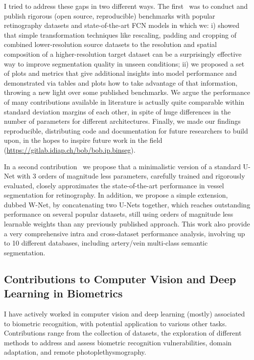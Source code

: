 \documentclass[11pt,a4paper,sans]{moderncv}
\begin{document}
I tried to address these gaps in two different ways.  The
first~\cite{arxiv-2019} was to conduct and publish rigorous (open source,
reproducible) benchmarks with popular retinography datasets and
state-of-the-art FCN models in which we: i) showed that simple transformation
techniques like rescaling, padding and cropping of combined lower-resolution
source datasets to the resolution and spatial composition of a
higher-resolution target dataset can be a surprisingly effective way to improve
segmentation quality in unseen conditions; ii) we proposed a set of plots and
metrics that give additional insights into model performance and demonstrated
via tables and plots how to take advantage of that information, throwing a new
light over some published benchmarks.  We argue the performance of many
contributions available in literature is actually quite comparable within
standard deviation margins of each other, in spite of huge differences in the
number of parameters for different architectures.  Finally, we made our
findings reproducible, distributing code and documentation for future
researchers to build upon, in the hopes to inspire future work in the
field (\url{https://gitlab.idiap.ch/bob/bob.ip.binseg}).

In a second contribution~\cite{arxiv-2020} we propose that a minimalistic
version of a standard U-Net with 3 orders of magnitude less parameters,
carefully trained and rigorously evaluated, closely approximates the
state-of-the-art performance in vessel segmentation for retinography.  In
addition, we propose a simple extension, dubbed W-Net, by concatenating two
U-Nets together, which reaches outstanding performance on several popular
datasets, still using orders of magnitude less learnable weights than any
previously published approach.  This work also provide a very comprehensive
intra and cross-dataset performance analysis, involving up to 10 different
databases, including artery/vein multi-class semantic segmentation.


\subsection{Contributions to Computer Vision and Deep Learning in Biometrics}

I have actively worked in computer vision and deep learning (mostly) associated
to biometric recognition, with potential application to various other tasks.
Contributions range from the collection of datasets, the exploration of
different methods to address and assess biometric recognition vulnerabilities,
domain adaptation, and remote photoplethysmography.
\end{document}
